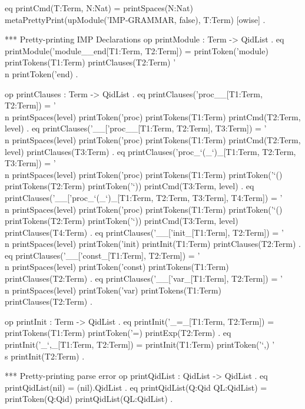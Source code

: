 \documentclass{llncs}%
\begin{document}
 eq printCmd(T:Term, N:Nat) =
    printSpaces(N:Nat) 
    metaPrettyPrint(upModule('IMP-GRAMMAR, false), T:Term) [owise] .

 *** Pretty-printing IMP Declarations
 op printModule : Term -> QidList .
 eq printModule('module__end[T1:Term, T2:Term]) =
    printToken('module) printTokens(T1:Term)
        printClauses(T2:Term)
        '\\n printToken('end) .

 op printClauses : Term -> QidList .
 eq printClauses('proc__[T1:Term, T2:Term]) =
    '\\n printSpaces(level)
    printToken('proc) printTokens(T1:Term)
    printCmd(T2:Term, level) .
 eq printClauses('__['proc__[T1:Term, T2:Term], T3:Term]) =
    '\\n printSpaces(level) printToken('proc) printTokens(T1:Term)
    printCmd(T2:Term, level)
    printClauses(T3:Term) .
 eq printClauses('proc_`(_`)_[T1:Term, T2:Term, T3:Term]) =
    '\\n printSpaces(level)
    printToken('proc) printTokens(T1:Term)
    printToken('`() printTokens(T2:Term) printToken('`))
    printCmd(T3:Term, level) .
 eq printClauses('__['proc_`(_`)_[T1:Term, T2:Term, T3:Term], T4:Term]) =
    '\\n printSpaces(level) printToken('proc) 
    printTokens(T1:Term) printToken('`() printTokens(T2:Term) printToken('`)) 
    printCmd(T3:Term, level)
    printClauses(T4:Term) .
 eq printClauses('__['init_[T1:Term], T2:Term]) =
    '\\n printSpaces(level) printToken('init) 
    printInit(T1:Term) printClauses(T2:Term) .
 eq printClauses('__['const_[T1:Term], T2:Term]) =
    '\\n printSpaces(level) printToken('const) 
    printTokens(T1:Term) printClauses(T2:Term) .
 eq printClauses('__['var_[T1:Term], T2:Term]) =
        '\\n printSpaces(level) printToken('var) 
    printTokens(T1:Term) printClauses(T2:Term) .
 
 op printInit : Term -> QidList .
 eq printInit('_=_[T1:Term, T2:Term]) =
    printTokens(T1:Term) printToken('=) printExp(T2:Term) .
 eq printInit('_`,_[T1:Term, T2:Term]) =
    printInit(T1:Term) printToken('`,) '\\s printInit(T2:Term) .

 *** Pretty-printing parse error
 op printQidList : QidList -> QidList .
 eq printQidList(nil) = (nil).QidList .
 eq printQidList(Q:Qid QL:QidList) = printToken(Q:Qid) printQidList(QL:QidList) .
\end{document}
